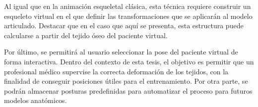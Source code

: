 Al igual que en la animación esqueletal clásica, esta técnica requiere construir un esqueleto virtual en el que definir las transformaciones que se aplicarán al modelo articulado. Destacar que en el caso que aquí se presenta, esta estructura puede calcularse a partir del tejido óseo del paciente virtual.




Por último, se permitirá al usuario seleccionar la pose del paciente virtual de forma interactiva. Dentro del contexto de esta tesis, el objetivo es permitir que un profesional médico supervise la correcta deformación de los tejidos, con la finalidad de conseguir posiciones útiles para el entrenamiento. Por otra parte, se podrán almacenar posturas predefinidas para automatizar el proceso para futuros modelos anatómicos.





